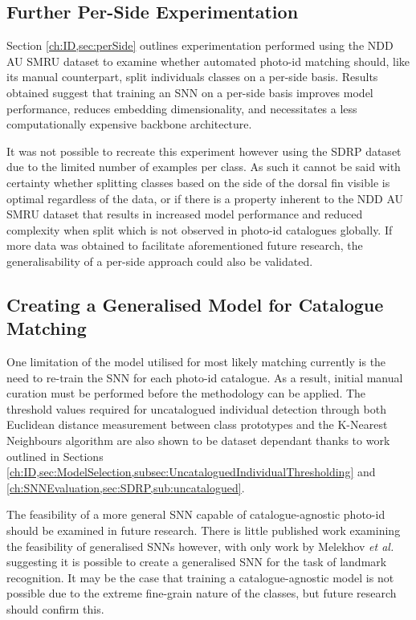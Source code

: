 \subsection{Further Per-Side Experimentation}\label{ch:Conclusion,sec:FutureWork,sub:MorePerSide}

Section \ref{ch:ID,sec:perSide} outlines experimentation performed using the NDD AU SMRU dataset to examine whether automated photo-id matching should, like its manual counterpart, split individuals classes on a per-side basis. Results obtained suggest that training an SNN on a per-side basis improves model performance, reduces embedding dimensionality, and necessitates a less computationally expensive backbone architecture.

It was not possible to recreate this experiment however using the SDRP dataset due to the limited number of examples per class. As such it cannot be said with certainty whether splitting classes based on the side of the dorsal fin visible is optimal regardless of the data, or if there is a property inherent to the NDD AU SMRU dataset that results in increased model performance and reduced complexity when split which is not observed in photo-id catalogues globally. If more data was obtained to facilitate aforementioned future research, the generalisability of a per-side approach could also be validated.  

\subsection{Creating a Generalised Model for Catalogue Matching}\label{ch:Conclusion,sec:FutureWork,sub:GeneralSNN}

One limitation of the model utilised for most likely matching currently is the need to re-train the SNN for each photo-id catalogue. As a result, initial manual curation must be performed before the methodology can be applied. The threshold values required for uncatalogued individual detection through both Euclidean distance measurement between class prototypes and the K-Nearest Neighbours algorithm are also shown to be dataset dependant thanks to work outlined in Sections \ref{ch:ID,sec:ModelSelection,subsec:UncataloguedIndividualThresholding} and \ref{ch:SNNEvaluation,sec:SDRP,sub:uncatalogued}. 

The feasibility of a more general SNN capable of catalogue-agnostic photo-id should be examined in future research. There is little published work examining the feasibility of generalised SNNs however, with only work by Melekhov \textit{et al.} \cite{melekhov_siamese_2016} suggesting it is possible to create a generalised SNN for the task of landmark recognition. It may be the case that training a catalogue-agnostic model is not possible due to the extreme fine-grain nature of the classes, but future research should confirm this. 

